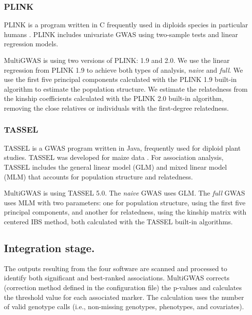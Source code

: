 \subsubsection{PLINK}
PLINK \cite{Purcell2007} is a program written in C frequently used in diploids species in particular humans \cite{Power2016}. PLINK includes univariate GWAS using two-sample tests and linear regression models.

MultiGWAS is using two versions of PLINK: 1.9 and 2.0. We use the linear regression from PLINK 1.9 to achieve both types of analysis, \emph{naive} and \emph{full}. We use the first five principal components calculated with the PLINK 1.9 built-in algorithm to estimate the population structure. We estimate the relatedness from the kinship coefficients calculated with the PLINK 2.0 built-in algorithm, removing the close relatives or individuals with the first-degree relatedness.

\subsubsection{TASSEL}

TASSEL  \cite{Bradbury2007}  is a GWAS program written in Java, frequently used for diploid plant studies. TASSEL was developed for maize data \cite{Alvarez2017,Zhang2018}. For association analysis, TASSEL includes the general linear model (GLM) and mixed linear model (MLM) that accounts for population structure and relatedness.

MultiGWAS is using TASSEL 5.0. The \emph{naive} GWAS uses GLM. The \emph{full} GWAS uses MLM with two parameters: one for population structure, using the first five principal components, and another for relatedness, using the kinship matrix with centered IBS method, both calculated with the TASSEL built-in algorithms.

\subsection{Integration stage.} The outputs resulting from the four software are scanned and processed to identify both significant and best-ranked associations. MultiGWAS corrects (correction method defined in the configuration file) the p-values and calculates the threshold value for each associated marker. The calculation uses the number of valid genotype calls (i.e., non-missing genotypes, phenotypes, and covariates).

